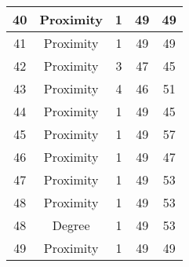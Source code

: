 \documentclass[results.tex]{subfiles}
\begin{document}
\begin{center}
\begin{tabular}{| c || c | c | c | c |}
            \hline
            40                      & Proximity                    & 1                      & 49                      & 49                   \\
            \hline
            41                      & Proximity                    & 1                      & 49                      & 49                   \\
            \hline
            42                      & Proximity                    & 3                      & 47                      & 45                   \\
            \hline
            43                      & Proximity                    & 4                      & 46                      & 51                   \\
            \hline
            44                      & Proximity                    & 1                      & 49                      & 45                   \\
            \hline
            45                      & Proximity                    & 1                      & 49                      & 57                   \\
            \hline
            46                      & Proximity                    & 1                      & 49                      & 47                   \\
            \hline
            47                      & Proximity                    & 1                      & 49                      & 53                   \\
            \hline
            48                      & Proximity                    & 1                      & 49                      & 53                   \\
            \hline
            48                      & Degree                       & 1                      & 49                      & 53                   \\
            \hline
            49                      & Proximity                    & 1                      & 49                      & 49                   \\
            \hline
        \end{tabular}
    \end{center}
\end{document}

